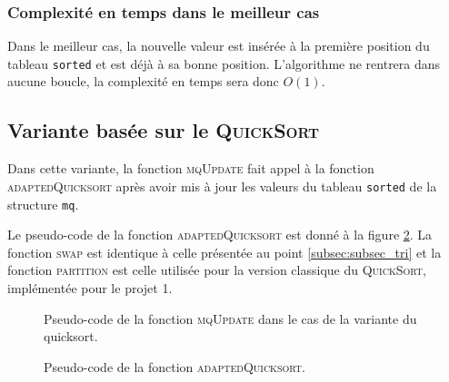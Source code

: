 \documentclass[a4paper, 12pt]{article}
\begin{document}
	\subsubsection{Complexité en temps dans le meilleur cas}
	Dans le meilleur cas, la nouvelle valeur est insérée à la première position du tableau \texttt{sorted} et est déjà à sa bonne position. L'algorithme ne rentrera dans aucune boucle, la complexité en temps sera donc \(O\left(1\right)\).
	\subsection{Variante basée sur le \textsc{QuickSort}}
	Dans cette variante, la fonction \textsc{mqUpdate} fait appel à la fonction \textsc{adaptedQuicksort} après avoir mis à jour les valeurs du tableau \texttt{sorted} de la structure \texttt{mq}.\par
	Le pseudo-code de la fonction \textsc{adaptedQuicksort} est donné à la figure \ref{fig:pseudo_code_quicksort}. La fonction \textsc{swap} est identique à celle présentée au point \ref{subsec:subsec_tri} et la fonction \textsc{partition} est celle utilisée pour la version classique du \textsc{QuickSort}, implémentée pour le projet 1.\par
	\begin{figure}[!ht]
		\centering
		\setlength{\fboxsep}{3mm}
		\setlength{\fboxrule}{1.5pt}
		\caption{Pseudo-code de la fonction \textsc{mqUpdate} dans le cas de la variante du quicksort.}
		\label{fig:pseudo_code_quicksort_mqupdate}
	\end{figure}
	\begin{figure}[!ht]
		\centering
		\setlength{\fboxsep}{3mm}
		\setlength{\fboxrule}{1.5pt}
		\caption{Pseudo-code de la fonction \textsc{adaptedQuicksort}.}
		\label{fig:pseudo_code_quicksort}
	\end{figure}
\end{document}

